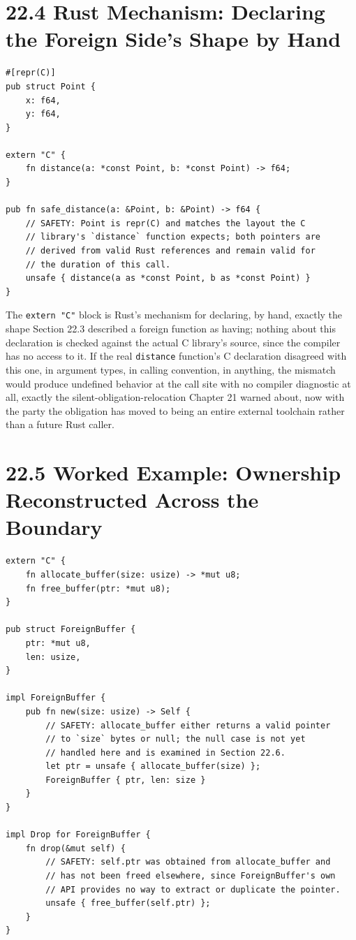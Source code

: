 \documentclass[11pt]{book}
\begin{document}
\section*{22.4 Rust Mechanism: Declaring the Foreign Side's Shape by Hand}

\begin{lstlisting}
#[repr(C)]
pub struct Point {
    x: f64,
    y: f64,
}

extern "C" {
    fn distance(a: *const Point, b: *const Point) -> f64;
}

pub fn safe_distance(a: &Point, b: &Point) -> f64 {
    // SAFETY: Point is repr(C) and matches the layout the C
    // library's `distance` function expects; both pointers are
    // derived from valid Rust references and remain valid for
    // the duration of this call.
    unsafe { distance(a as *const Point, b as *const Point) }
}
\end{lstlisting}

The \texttt{extern "C"} block is Rust's mechanism for declaring, by hand, exactly the shape Section 22.3 described a foreign function as having; nothing about this declaration is checked against the actual C library's source, since the compiler has no access to it. If the real \texttt{distance} function's C declaration disagreed with this one, in argument types, in calling convention, in anything, the mismatch would produce undefined behavior at the call site with no compiler diagnostic at all, exactly the silent-obligation-relocation Chapter 21 warned about, now with the party the obligation has moved to being an entire external toolchain rather than a future Rust caller.

\section*{22.5 Worked Example: Ownership Reconstructed Across the Boundary}

\begin{lstlisting}
extern "C" {
    fn allocate_buffer(size: usize) -> *mut u8;
    fn free_buffer(ptr: *mut u8);
}

pub struct ForeignBuffer {
    ptr: *mut u8,
    len: usize,
}

impl ForeignBuffer {
    pub fn new(size: usize) -> Self {
        // SAFETY: allocate_buffer either returns a valid pointer
        // to `size` bytes or null; the null case is not yet
        // handled here and is examined in Section 22.6.
        let ptr = unsafe { allocate_buffer(size) };
        ForeignBuffer { ptr, len: size }
    }
}

impl Drop for ForeignBuffer {
    fn drop(&mut self) {
        // SAFETY: self.ptr was obtained from allocate_buffer and
        // has not been freed elsewhere, since ForeignBuffer's own
        // API provides no way to extract or duplicate the pointer.
        unsafe { free_buffer(self.ptr) };
    }
}
\end{lstlisting}
\end{document}
